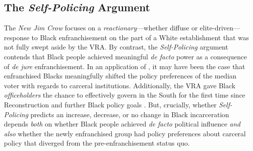 \documentclass[12pt]{article}
\begin{document}
\subsection*{The \emph{Self-Policing} Argument}

The \emph{New Jim Crow} focuses on a \emph{reactionary}---whether diffuse or elite-driven---response to Black enfranchisement on the part of a White establishment that was not fully swept aside by the VRA.  By contrast, the \emph{Self-Policing} argument contends that Black people achieved meaningful \emph{de facto} power as a consequence of \emph{de jure} enfranchisement.  In an application of \citep{Downs:1957vg}, it may have been the case that enfranchised Blacks meaningfully shifted the policy preferences of the median voter with regards to carceral institutions.  Additionally, the VRA gave Black \emph{officeholders} the chance to effectively govern in the South for the first time since Reconstruction and further Black policy goals \citep{Beach:2017wo}.  But, crucially, whether \emph{Self-Policing} predicts an increase, decrease, or no change in Black incarceration depends \emph{both} on whether Black people achieved \emph{de facto} political influence \emph{and also} whether the newly enfranchised group had policy preferences about carceral policy that diverged from the pre-enfranchisement status quo.
\end{document}
